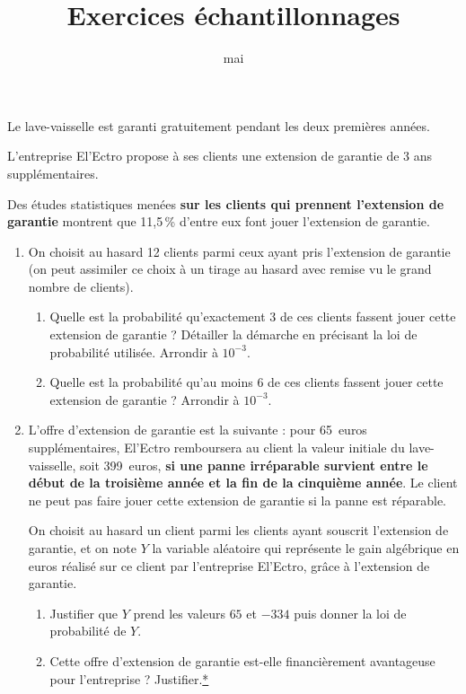 \documentclass[12pt,frenchb]{article}
\title{Exercices échantillonnages}
\date{mai \the\year}
\author{}
\begin{document}
\begin{question}[subtitle={Pondichéry 2015}]
Le lave-vaisselle est garanti gratuitement pendant les deux premières années.

L'entreprise El'Ectro propose à ses clients une extension de garantie de 3 ans
supplémentaires.

Des études statistiques menées \textbf{sur les clients qui prennent l'extension de garantie}
montrent que 11,5\,\% d'entre eux font jouer l'extension de garantie.

\medskip

\begin{enumerate}
\item On choisit au hasard 12 clients parmi ceux ayant pris l'extension de garantie (on peut
assimiler ce choix à un tirage au hasard avec remise vu le grand nombre de clients).
	\begin{enumerate}
		\item Quelle est la probabilité qu'exactement 3 de ces clients fassent jouer cette
extension de garantie ? Détailler la démarche en précisant la loi de probabilité
utilisée. Arrondir à $10^{-3}$.
		\item Quelle est la probabilité qu'au moins 6 de ces clients fassent jouer cette extension de garantie ? Arrondir à $10^{-3}$.
	\end{enumerate}
\item  L'offre d'extension de garantie est la suivante : pour 65~euros supplémentaires,
El'Ectro remboursera au client la valeur initiale du lave-vaisselle, soit 399~euros, \textbf{si
une panne irréparable survient entre le début de la troisième année et la fin de la
cinquième année}. Le client ne peut pas faire jouer cette extension de garantie si la
panne est réparable.
	
On choisit au hasard un client parmi les clients ayant souscrit l'extension de garantie,
et on note $Y$ la variable aléatoire qui représente le gain algébrique en euros réalisé sur
ce client par l'entreprise El'Ectro, grâce à l'extension de garantie.
	
\medskip
	
	\begin{enumerate}
		\item Justifier que $Y$ prend les valeurs $65$ et $- 334$ puis donner la loi de probabilité de $Y$.
		\item Cette offre d'extension de garantie est-elle financièrement avantageuse pour
l'entreprise ? Justifier.\hyperlink{Index}{*}
	\end{enumerate}
\end{enumerate}
\end{question}
\end{document}
